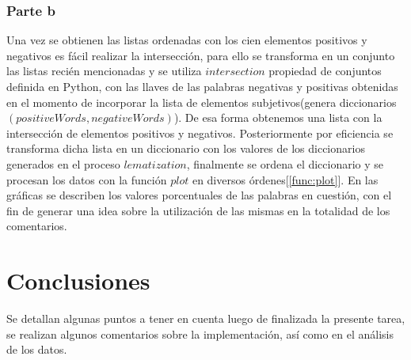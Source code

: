 \documentclass[12pt]{article}
\begin{document}
\subsubsection{Parte b}
Una vez se obtienen las listas ordenadas con los cien elementos positivos y negativos es fácil realizar la intersección, para ello se transforma en un conjunto las listas recién mencionadas y se utiliza $intersection$ propiedad de conjuntos definida en Python, con las llaves de las palabras negativas y positivas obtenidas en el momento de incorporar la lista de elementos subjetivos(genera diccionarios $(positiveWords, negativeWords)$). De esa forma obtenemos una lista con la intersección de elementos positivos y negativos.
Posteriormente por eficiencia se transforma dicha lista en un diccionario con los valores de los diccionarios generados en el proceso $lematization$, finalmente se ordena el diccionario y se procesan los datos con la función $plot$ en diversos órdenes[\ref{func:plot}].
En las gráficas se describen los valores porcentuales de las palabras en cuestión, con el fin de generar una idea sobre la utilización de las mismas en la totalidad de los comentarios.


\section{Conclusiones}\label{conclusions}
Se detallan algunas puntos a tener en cuenta luego de finalizada la presente tarea, se realizan algunos comentarios sobre la implementación, así como en el análisis de los datos.
\end{document}
